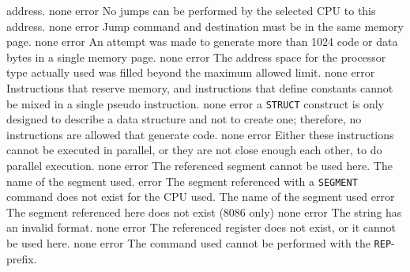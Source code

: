 \documentclass[12pt,twoside]{report}
\newcommand{\tty}[1]{{\tt #1}}
\begin{document}
\begin{description}
{                address.}
               {none}
               {error}
               {No jumps can be performed by the selected CPU to this
                address.}
               {none}
               {error}
               {Jump command and destination must be in the same memory
                page.}
               {none}
               {error}
               {An attempt was made to generate more than 1024 code or
                data bytes in a single memory page.}
               {none}
               {error}
               {The address space for the processor type actually used was
                filled beyond the maximum allowed limit.}
               {none}
               {error}
               {Instructions that reserve memory, and instructions that define
                constants cannot be mixed in a single pseudo instruction.}
               {none}
               {error}
               {a \tty{STRUCT} construct is only designed to describe a
                data structure and not to create one; therefore, no
                instructions are allowed that generate code.}
               {none}
               {error}
               {Either these instructions cannot be executed in parallel,
                or they are not close enough each other, to do parallel
                execution.}
               {none}
               {error}
               {The referenced segment cannot be used here.}
               {The name of the segment used.}
               {error}
               {The segment referenced with a \tty{SEGMENT} command does not
                exist for the CPU used.}
               {The name of the segment used}
               {error}
               {The segment referenced here does not exist (8086 only)}
               {none}
               {error}
               {The string has an invalid format.}
               {none}
               {error}
               {The referenced register does not exist, or it cannot
                be used here.}
               {none}
               {error}
               {The command used cannot be performed with the \tty{REP}-prefix.}

\end{description}
\end{document}
